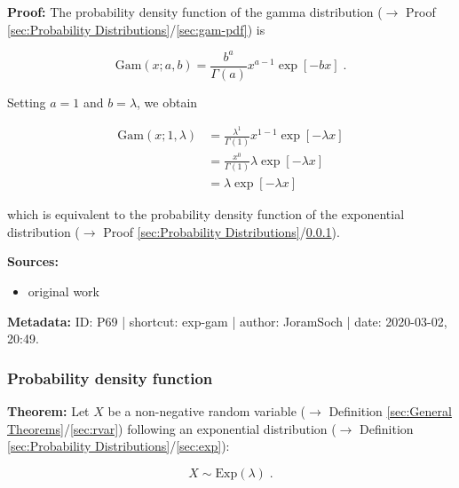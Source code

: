 \documentclass[a4paper,12pt,twoside]{book}
\begin{document}
\vspace{1em}
\textbf{Proof:} The probability density function of the gamma distribution ($\rightarrow$ Proof \ref{sec:Probability Distributions}/\ref{sec:gam-pdf}) is

\begin{equation} \label{eq:exp-gam-gam-pdf}
\mathrm{Gam}(x; a, b) = \frac{b^a}{\Gamma(a)} x^{a-1} \exp[-b x] \; .
\end{equation}

Setting $a = 1$ and $b = \lambda$, we obtain

\begin{equation} \label{eq:exp-gam-exp-pdf}
\begin{split}
\mathrm{Gam}(x; 1, \lambda) &= \frac{\lambda^1}{\Gamma(1)} x^{1-1} \exp[-\lambda x] \\
&= \frac{x^0}{\Gamma(1)} \lambda \exp[-\lambda x] \\
&= \lambda \exp[-\lambda x]
\end{split}
\end{equation}

which is equivalent to the probability density function of the exponential distribution ($\rightarrow$ Proof \ref{sec:Probability Distributions}/\ref{sec:exp-pdf}).


\vspace{1em}
\textbf{Sources:}
\begin{itemize}
\item original work\end{itemize}


\vspace{1em}
\textbf{Metadata:} ID: P69 | shortcut: exp-gam | author: JoramSoch | date: 2020-03-02, 20:49.
\vspace{1em}



\subsubsection[\textbf{Probability density function}]{Probability density function} \label{sec:exp-pdf}
\setcounter{equation}{0}

\textbf{Theorem:} Let $X$ be a non-negative random variable ($\rightarrow$ Definition \ref{sec:General Theorems}/\ref{sec:rvar}) following an exponential distribution ($\rightarrow$ Definition \ref{sec:Probability Distributions}/\ref{sec:exp}):

\begin{equation} \label{eq:exp-pdf-exp}
X \sim \mathrm{Exp}(\lambda) \; .
\end{equation}
\end{document}
